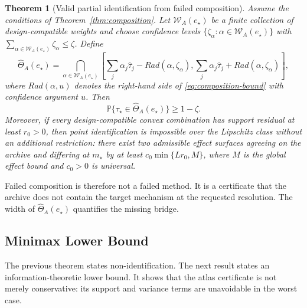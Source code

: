 \documentclass[11pt]{article}
\numberwithin{equation}{section}
\newtheorem{theorem}{Theorem}[section]
\newcommand{\Pbb}{\mathbb P}
\newcommand{\1}{\mathbf 1}
\newcommand{\cW}{\mathcal W}
\begin{document}
\begin{theorem}[Valid partial identification from failed composition]
\label{thm:partial-id}
Assume the conditions of Theorem~\ref{thm:composition}.  Let \(\cW_A(e_\star)\) be a finite collection of design-compatible weights and choose confidence levels \(\{\zeta_\alpha:\alpha\in\cW_A(e_\star)\}\) with \(\sum_{\alpha\in\cW_A(e_\star)}\zeta_\alpha\le\zeta\).  Define
\begin{equation}
\label{eq:pid-est}
  \widehat\Theta_A(e_\star)
  =
  \bigcap_{\alpha\in\cW_A(e_\star)}
  \left[
  \sum_j\alpha_j\widehat\tau_j-Rad(\alpha,\zeta_\alpha),
  \sum_j\alpha_j\widehat\tau_j+Rad(\alpha,\zeta_\alpha)
  \right],
\end{equation}
where \(Rad(\alpha,u)\) denotes the right-hand side of \eqref{eq:composition-bound} with confidence argument \(u\).  Then
\[
  \Pbb\{\tau_\star\in\widehat\Theta_A(e_\star)\}\ge1-\zeta.
\]
Moreover, if every design-compatible convex combination has support residual at least \(r_0>0\), then point identification is impossible over the Lipschitz class without an additional restriction: there exist two admissible effect surfaces agreeing on the archive and differing at \(m_\star\) by at least \(c_0\min\{Lr_0,M\}\), where \(M\) is the global effect bound and \(c_0>0\) is universal.
\end{theorem}

Failed composition is therefore not a failed method.  It is a certificate that the archive does not contain the target mechanism at the requested resolution.  The width of \(\widehat\Theta_A(e_\star)\) quantifies the missing bridge.

\subsection{Minimax Lower Bound}

The previous theorem states non-identification.  The next result states an information-theoretic lower bound.  It shows that the atlas certificate is not merely conservative: its support and variance terms are unavoidable in the worst case.
\end{document}

